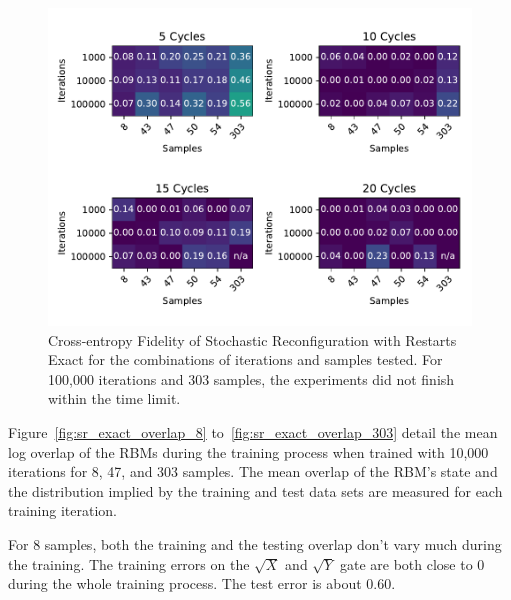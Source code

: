 \begin{figure}[H]
  \centering
  \includegraphics[width=\textwidth]{figures/results/SR-restarts-not-learned/fxeb_heatmap.pdf}
  \caption[Cross-entropy Fidelity of Stochastic Reconfiguration with Restarts Exact]{Cross-entropy Fidelity of Stochastic 
  Reconfiguration with Restarts Exact for the combinations of iterations and samples tested.
  For 100,000 iterations and 303 samples, the experiments did not finish within the time limit.}
  \label{fig:sr_exact_fxeb}
\end{figure}

Figure~\ref{fig:sr_exact_overlap_8} to~\ref{fig:sr_exact_overlap_303} detail the mean log overlap of the RBMs during the 
training process when trained with 10,000 iterations for 8, 47, and 303 samples. The 
mean overlap of the RBM's state and the distribution implied by the training and test data sets are measured 
for each training iteration.

For 8 samples, both the training and the testing overlap don't vary much during the training. The training errors on the $\sqrt{X}$ and 
$\sqrt{Y}$ gate are both close to 0 during the whole training process. The test error is about 0.60.

